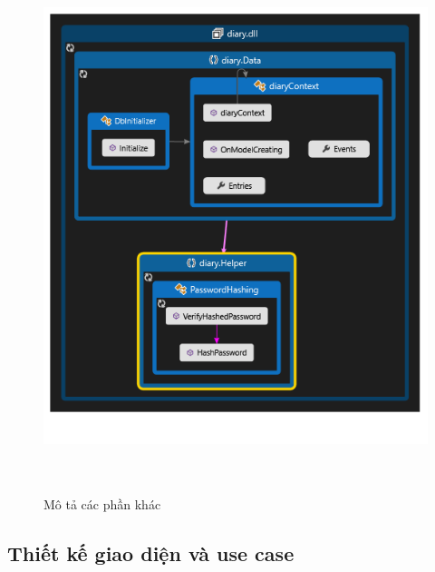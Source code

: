 \documentclass[a4paper]{article}
\begin{document}
\begin{enumerate}
	\newpage


	\begin{figure}[!h]
	 			\centering
      			\includegraphics[height=440pt,width=390pt]{Images/h6.png}
	 		 	\caption{Mô tả các phần khác}
	 		 	\label{mainbook6}
	  		\end{figure}
\end{enumerate}


	\newpage


\subsection{Thiết kế giao diện và use case}
\end{document}
